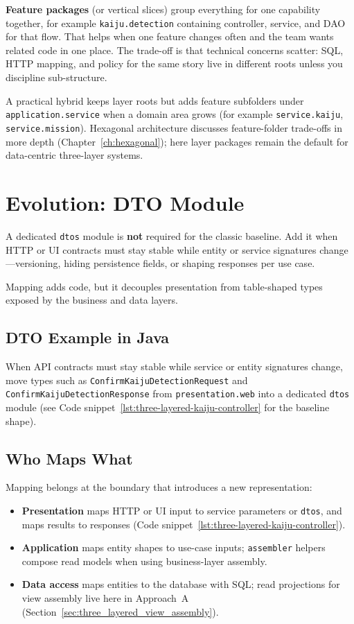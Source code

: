 \textbf{Feature packages} (or vertical slices) group everything for one capability together, for example \texttt{kaiju.detection} containing controller, service, and DAO for that flow. That helps when one feature changes often and the team wants related code in one place. The trade-off is that technical concerns scatter: SQL, HTTP mapping, and policy for the same story live in different roots unless you discipline sub-structure.

A practical hybrid keeps layer roots but adds feature subfolders under \texttt{application.service} when a domain area grows (for example \texttt{service.kaiju}, \texttt{service.mission}). Hexagonal architecture discusses feature-folder trade-offs in more depth (Chapter~\ref{ch:hexagonal}); here layer packages remain the default for data-centric three-layer systems.

\section{Evolution: DTO Module}
\label{sec:three_layered_dto_module}

A dedicated \texttt{dtos} module is \textbf{not} required for the classic baseline. Add it when HTTP or UI contracts must stay stable while entity or service signatures change---versioning, hiding persistence fields, or shaping responses per use case.

Mapping adds code, but it decouples presentation from table-shaped types exposed by the business and data layers.

\subsection{DTO Example in Java}
\label{sec:three_layered_dto_java}

When API contracts must stay stable while service or entity signatures change, move types such as \texttt{ConfirmKaijuDetectionRequest} and \texttt{ConfirmKaijuDetectionResponse} from \texttt{presentation.web} into a dedicated \texttt{dtos} module (see Code snippet~\ref{lst:three-layered-kaiju-controller} for the baseline shape).

\subsection{Who Maps What}
\label{sec:three_layered_mapping_boundaries}

Mapping belongs at the boundary that introduces a new representation:
\begin{itemize}
    \item \textbf{Presentation} maps HTTP or UI input to service parameters or \texttt{dtos}, and maps results to responses (Code snippet~\ref{lst:three-layered-kaiju-controller}).
    \item \textbf{Application} maps entity shapes to use-case inputs; \texttt{assembler} helpers compose read models when using business-layer assembly.
    \item \textbf{Data access} maps entities to the database with SQL; read projections for view assembly live here in Approach~A (Section~\ref{sec:three_layered_view_assembly}).
\end{itemize}

